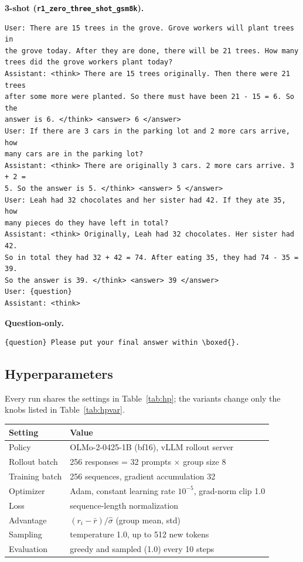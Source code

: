 \documentclass{article}
\begin{document}
\textbf{3-shot (\texttt{r1\_zero\_three\_shot\_gsm8k}).}\nobreak
{\small
\begin{verbatim}
User: There are 15 trees in the grove. Grove workers will plant trees in
the grove today. After they are done, there will be 21 trees. How many
trees did the grove workers plant today?
Assistant: <think> There are 15 trees originally. Then there were 21 trees
after some more were planted. So there must have been 21 - 15 = 6. So the
answer is 6. </think> <answer> 6 </answer>
User: If there are 3 cars in the parking lot and 2 more cars arrive, how
many cars are in the parking lot?
Assistant: <think> There are originally 3 cars. 2 more cars arrive. 3 + 2 =
5. So the answer is 5. </think> <answer> 5 </answer>
User: Leah had 32 chocolates and her sister had 42. If they ate 35, how
many pieces do they have left in total?
Assistant: <think> Originally, Leah had 32 chocolates. Her sister had 42.
So in total they had 32 + 42 = 74. After eating 35, they had 74 - 35 = 39.
So the answer is 39. </think> <answer> 39 </answer>
User: {question}
Assistant: <think>
\end{verbatim}
}

\textbf{Question-only.}\nobreak
{\small
\begin{verbatim}
{question} Please put your final answer within \boxed{}.
\end{verbatim}
}

\subsection{Hyperparameters}
\label{app:hp}

Every run shares the settings in Table~\ref{tab:hp}; the variants change only
the knobs listed in Table~\ref{tab:hpvar}.

\begin{minipage}{\linewidth}
\small
\centering
{}
\label{tab:hp}
\begin{tabular}{@{}ll@{}}
\toprule
Setting & Value \\
\midrule
Policy & OLMo-2-0425-1B (bf16), vLLM rollout server \\
Rollout batch & 256 responses = 32 prompts $\times$ group size 8 \\
Training batch & 256 sequences, gradient accumulation 32 \\
Optimizer & Adam, constant learning rate $10^{-5}$, grad-norm clip 1.0 \\
Loss & sequence-length normalization \\
Advantage & $(r_i - \bar r)/\hat\sigma$ (group mean, std) \\
Sampling & temperature 1.0, up to 512 new tokens \\
Evaluation & greedy and sampled (1.0) every 10 steps \\
\bottomrule
\end{tabular}
\end{minipage}
\end{document}
